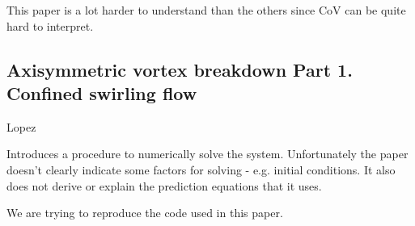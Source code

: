 \documentclass{X:/Documents/Coding/Latex/myreport}
\begin{document}
This paper is a lot harder to understand than the others since CoV can be quite hard to interpret.



\subsection{Axisymmetric vortex breakdown Part 1. Confined swirling flow}

Lopez

Introduces a procedure to numerically solve the system. Unfortunately the paper doesn't clearly indicate some factors for solving - e.g. initial conditions. It also does not derive or explain the prediction equations that it uses.


We are trying to reproduce the code used in this paper.












\clearpage



 







\clearpage
\end{document}
